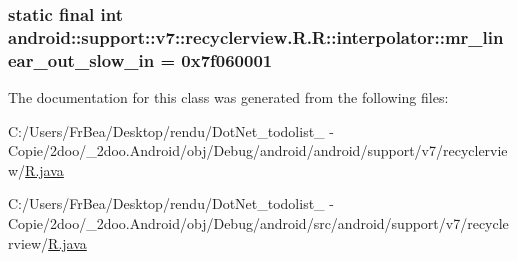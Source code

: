 \hypertarget{classandroid_1_1support_1_1v7_1_1recyclerview_1_1_r_1_1interpolator_0081d5709e39b13c119a3294a93fd434}{
\subsubsection[{mr\_\-linear\_\-out\_\-slow\_\-in}]{\setlength{\rightskip}{0pt plus 5cm}static final int android::support::v7::recyclerview.R.R::interpolator::mr\_\-linear\_\-out\_\-slow\_\-in = 0x7f060001}}
\label{classandroid_1_1support_1_1v7_1_1recyclerview_1_1_r_1_1interpolator_0081d5709e39b13c119a3294a93fd434}




The documentation for this class was generated from the following files:\begin{CompactItemize}
\item 
C:/Users/FrBea/Desktop/rendu/DotNet\_\-todolist\_ - Copie/2doo/\_\-2doo.Android/obj/Debug/android/android/support/v7/recyclerview/\hyperlink{android_2support_2v7_2recyclerview_2_r_8java}{R.java}\item 
C:/Users/FrBea/Desktop/rendu/DotNet\_\-todolist\_ - Copie/2doo/\_\-2doo.Android/obj/Debug/android/src/android/support/v7/recyclerview/\hyperlink{src_2android_2support_2v7_2recyclerview_2_r_8java}{R.java}\end{CompactItemize}
